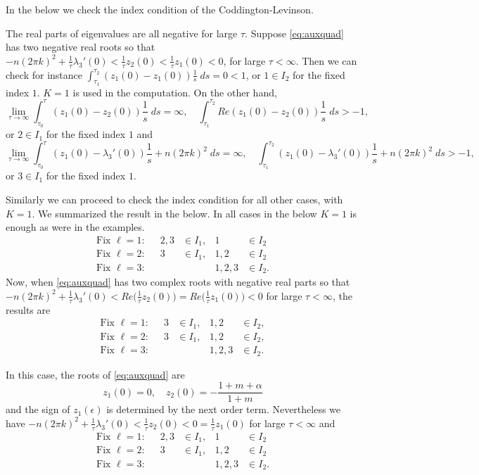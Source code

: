 \documentclass[a4paper,11pt]{article}
\theoremstyle{remark}
\begin{document}

In the below we check the index condition of the Coddington-Levinson. 

 The real parts of eigenvalues are all negative for large $\tau$. Suppose \eqref{eq:auxquad} has two negative real roots so that  $-n(2\pi k)^2 + \frac{1}{\tau}\lambda_3'(0)<\frac{1}{\tau}z_2(0)<\frac{1}{\tau}z_1(0)<0$, for large $\tau<\infty$.  Then we can check for instance
$\displaystyle\int_{\tau_1}^{\tau_2} (z_1(0)-z_1(0))\frac{1}{s} \; ds = 0< 1$,
or $1\in I_2$ for the fixed index $1$. $K=1$ is used in the computation. On the other hand,
$$ \lim_{\tau \rightarrow \infty}\int_{\tau_0}^\tau (z_1(0)-z_2(0))\frac{1}{s} \; ds = \infty, \quad  \int_{\tau_1}^{\tau_2} Re (z_1(0)-z_2(0))\frac{1}{s} \; ds > -1,$$
or $2\in I_1$ for the fixed index $1$ and
$$ \lim_{\tau \rightarrow \infty}\int_{\tau_0}^\tau (z_1(0)-\lambda_3'(0))\frac{1}{s} + n(2\pi k)^2 \; ds =\infty, \quad  \int_{\tau_1}^{\tau_2} (z_1(0)-\lambda_3'(0))\frac{1}{s} + n(2\pi k)^2 \; ds > -1,$$
or $3\in I_1$ for the fixed index $1$.

 Similarly we can proceed to check the index condition for all other cases, with $K=1$.
We summarized the result in the below. In all cases in the below $K=1$ is enough as were in the examples.
\begin{align*}
  \text{Fix $\ell=1$:}&& 2,3&\in I_1, & 1&\in I_2\\
  \text{Fix $\ell=2$:}&& 3&\in I_1, & 1,2&\in I_2\\
  \text{Fix $\ell=3$:}&& & & 1,2,3&\in I_2.
\end{align*}
Now, when \eqref{eq:auxquad} has two complex roots with negative real parts so that $-n(2\pi k)^2 + \frac{1}{\tau}\lambda_3'(0)<Re\Big(\frac{1}{\tau}z_2(0)\Big)=Re\Big(\frac{1}{\tau}z_1(0)\Big)<0$ for large $\tau<\infty$, the results are
\begin{align*}
  \text{Fix $\ell=1$:}&& 3&\in I_1, & 1,2&\in I_2,\\
  \text{Fix $\ell=2$:}&& 3&\in I_1, & 1,2&\in I_2,\\
  \text{Fix $\ell=3$:}&& & & 1,2,3&\in I_2.
\end{align*}


 In this case, the roots of \eqref{eq:auxquad} are 
$$ z_1(0)=0, \quad z_2(0) = -\frac{1+m+\alpha}{1+m}$$
and the sign of $z_1(\epsilon)$ is determined by the next order term. Nevertheless we have 
$-n(2\pi k)^2 + \frac{1}{\tau}\lambda_3'(0)<\frac{1}{\tau}z_2(0)<0=\frac{1}{\tau}z_1(0)$ for large $\tau<\infty$ and
\begin{align*}
  \text{Fix $\ell=1$:}&& 2,3&\in I_1, & 1&\in I_2\\
  \text{Fix $\ell=2$:}&& 3&\in I_1, & 1,2&\in I_2\\
  \text{Fix $\ell=3$:}&& & & 1,2,3&\in I_2.
\end{align*}
\end{document}
